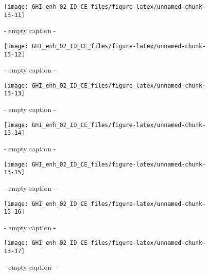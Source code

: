 \documentclass[
  10pt,
  a4paper,oneside]{article}
\begin{document}
\begin{figure}[H]

{\centering \texttt{[image: GHI\_enh\_02\_ID\_CE\_files/figure-latex/unnamed-chunk-13-11]} 

}

\caption{ - empty caption - }\label{fig:unnamed-chunk-13-11}
\end{figure}
\begin{figure}[H]

{\centering \texttt{[image: GHI\_enh\_02\_ID\_CE\_files/figure-latex/unnamed-chunk-13-12]} 

}

\caption{ - empty caption - }\label{fig:unnamed-chunk-13-12}
\end{figure}
\begin{figure}[H]

{\centering \texttt{[image: GHI\_enh\_02\_ID\_CE\_files/figure-latex/unnamed-chunk-13-13]} 

}

\caption{ - empty caption - }\label{fig:unnamed-chunk-13-13}
\end{figure}
\begin{figure}[H]

{\centering \texttt{[image: GHI\_enh\_02\_ID\_CE\_files/figure-latex/unnamed-chunk-13-14]} 

}

\caption{ - empty caption - }\label{fig:unnamed-chunk-13-14}
\end{figure}
\begin{figure}[H]

{\centering \texttt{[image: GHI\_enh\_02\_ID\_CE\_files/figure-latex/unnamed-chunk-13-15]} 

}

\caption{ - empty caption - }\label{fig:unnamed-chunk-13-15}
\end{figure}
\begin{figure}[H]

{\centering \texttt{[image: GHI\_enh\_02\_ID\_CE\_files/figure-latex/unnamed-chunk-13-16]} 

}

\caption{ - empty caption - }\label{fig:unnamed-chunk-13-16}
\end{figure}
\begin{figure}[H]

{\centering \texttt{[image: GHI\_enh\_02\_ID\_CE\_files/figure-latex/unnamed-chunk-13-17]} 

}

\caption{ - empty caption - }\label{fig:unnamed-chunk-13-17}
\end{figure}
\end{document}
